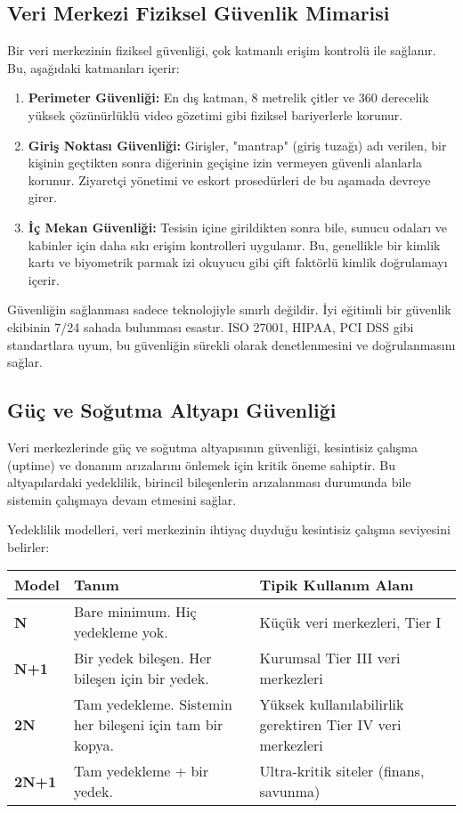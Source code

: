 \subsection{Veri Merkezi Fiziksel Güvenlik Mimarisi}

Bir veri merkezinin fiziksel güvenliği, çok katmanlı erişim kontrolü ile sağlanır. Bu, aşağıdaki katmanları içerir:
\begin{enumerate}
    \item \textbf{Perimeter Güvenliği:} En dış katman, 8 metrelik çitler ve 360 derecelik yüksek çözünürlüklü video gözetimi gibi fiziksel bariyerlerle korunur.
    \item \textbf{Giriş Noktası Güvenliği:} Girişler, "mantrap" (giriş tuzağı) adı verilen, bir kişinin geçtikten sonra diğerinin geçişine izin vermeyen güvenli alanlarla korunur. Ziyaretçi yönetimi ve eskort prosedürleri de bu aşamada devreye girer.
    \item \textbf{İç Mekan Güvenliği:} Tesisin içine girildikten sonra bile, sunucu odaları ve kabinler için daha sıkı erişim kontrolleri uygulanır. Bu, genellikle bir kimlik kartı ve biyometrik parmak izi okuyucu gibi çift faktörlü kimlik doğrulamayı içerir.
\end{enumerate}
Güvenliğin sağlanması sadece teknolojiyle sınırlı değildir. İyi eğitimli bir güvenlik ekibinin 7/24 sahada bulunması esastır. ISO 27001, HIPAA, PCI DSS gibi standartlara uyum, bu güvenliğin sürekli olarak denetlenmesini ve doğrulanmasını sağlar.

\subsection{Güç ve Soğutma Altyapı Güvenliği}

Veri merkezlerinde güç ve soğutma altyapısının güvenliği, kesintisiz çalışma (uptime) ve donanım arızalarını önlemek için kritik öneme sahiptir. Bu altyapılardaki yedeklilik, birincil bileşenlerin arızalanması durumunda bile sistemin çalışmaya devam etmesini sağlar.

Yedeklilik modelleri, veri merkezinin ihtiyaç duyduğu kesintisiz çalışma seviyesini belirler:

\begin{tabular}{|p{4cm}|p{6cm}|p{4cm}|}
\hline
\hline
\textbf{Model} & \textbf{Tanım} & \textbf{Tipik Kullanım Alanı}  \\
\hline
\hline
\textbf{N} & Bare minimum. Hiç yedekleme yok. & Küçük veri merkezleri, Tier I  \\
\hline
\hline
\textbf{N+1} & Bir yedek bileşen. Her bileşen için bir yedek. & Kurumsal Tier III veri merkezleri  \\
\hline
\hline
\textbf{2N} & Tam yedekleme. Sistemin her bileşeni için tam bir kopya. & Yüksek kullanılabilirlik gerektiren Tier IV veri merkezleri  \\
\hline
\hline
\textbf{2N+1} & Tam yedekleme + bir yedek. & Ultra-kritik siteler (finans, savunma)  \\
\hline
\hline
\hline
\end{tabular}

